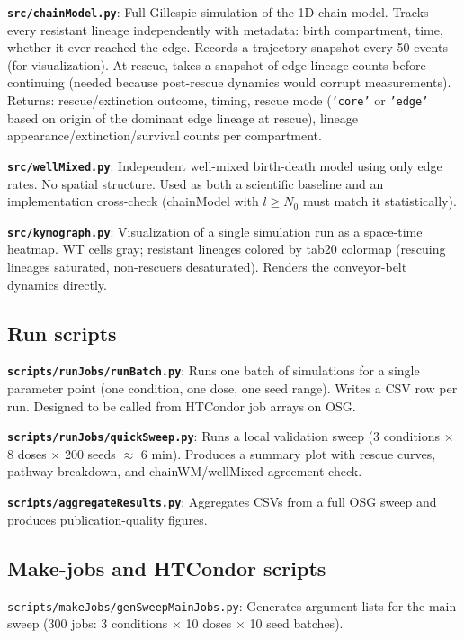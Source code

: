 \documentclass[12pt]{article}
\begin{document}
\textbf{\texttt{src/chainModel.py}}: Full Gillespie simulation of the
1D chain model. Tracks every resistant lineage independently with
metadata: birth compartment, time, whether it ever reached the edge.
Records a trajectory snapshot every 50 events (for visualization).
At rescue, takes a snapshot of edge lineage counts before continuing
(needed because post-rescue dynamics would corrupt measurements).
Returns: rescue/extinction outcome, timing, rescue mode
(\texttt{'core'} or \texttt{'edge'} based on origin of the dominant
edge lineage at rescue), lineage appearance/extinction/survival counts
per compartment.

\textbf{\texttt{src/wellMixed.py}}: Independent well-mixed birth-death
model using only edge rates. No spatial structure. Used as both a
scientific baseline and an implementation cross-check (chainModel with
$l \geq N_0$ must match it statistically).

\textbf{\texttt{src/kymograph.py}}: Visualization of a single simulation
run as a space-time heatmap. WT cells gray; resistant lineages colored
by tab20 colormap (rescuing lineages saturated, non-rescuers desaturated).
Renders the conveyor-belt dynamics directly.

\subsection{Run scripts}

\textbf{\texttt{scripts/runJobs/runBatch.py}}: Runs one batch of
simulations for a single parameter point (one condition, one dose,
one seed range). Writes a CSV row per run. Designed to be called from
HTCondor job arrays on OSG.

\textbf{\texttt{scripts/runJobs/quickSweep.py}}: Runs a local validation
sweep (3 conditions $\times$ 8 doses $\times$ 200 seeds $\approx$ 6 min).
Produces a summary plot with rescue curves, pathway breakdown, and
chainWM/wellMixed agreement check.

\textbf{\texttt{scripts/aggregateResults.py}}: Aggregates CSVs from a
full OSG sweep and produces publication-quality figures.

\subsection{Make-jobs and HTCondor scripts}

\texttt{scripts/makeJobs/genSweepMainJobs.py}: Generates argument lists
for the main sweep (300 jobs: 3 conditions $\times$ 10 doses $\times$ 10
seed batches).
\end{document}
